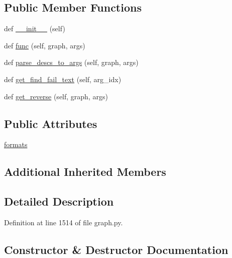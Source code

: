 \subsection*{Public Member Functions}
\begin{DoxyCompactItemize}
\item 
def \hyperlink{classlight__chats_1_1graph_1_1StealObjectFunction_a388f35f7fac6a0b0814254867c0509c4}{\+\_\+\+\_\+init\+\_\+\+\_\+} (self)
\item 
def \hyperlink{classlight__chats_1_1graph_1_1StealObjectFunction_a229fafa57d40e38da54a4b04947e2fe0}{func} (self, graph, args)
\item 
def \hyperlink{classlight__chats_1_1graph_1_1StealObjectFunction_a96475b7b415e03eb52d9efee518e755f}{parse\+\_\+descs\+\_\+to\+\_\+args} (self, graph, args)
\item 
def \hyperlink{classlight__chats_1_1graph_1_1StealObjectFunction_a1ffe38f920399831ab1fba3cd324c106}{get\+\_\+find\+\_\+fail\+\_\+text} (self, arg\+\_\+idx)
\item 
def \hyperlink{classlight__chats_1_1graph_1_1StealObjectFunction_a2e77998e7383d823d66f0adc22226ba0}{get\+\_\+reverse} (self, graph, args)
\end{DoxyCompactItemize}
\subsection*{Public Attributes}
\begin{DoxyCompactItemize}
\item 
\hyperlink{classlight__chats_1_1graph_1_1StealObjectFunction_a07d054e11c32eecd7c93102de254ffec}{formats}
\end{DoxyCompactItemize}
\subsection*{Additional Inherited Members}


\subsection{Detailed Description}
\begin{DoxyVerb}
\end{DoxyVerb}
 

Definition at line 1514 of file graph.\+py.



\subsection{Constructor \& Destructor Documentation}
\mbox{\label{classlight__chats_1_1graph_1_1StealObjectFunction_a388f35f7fac6a0b0814254867c0509c4}} 
